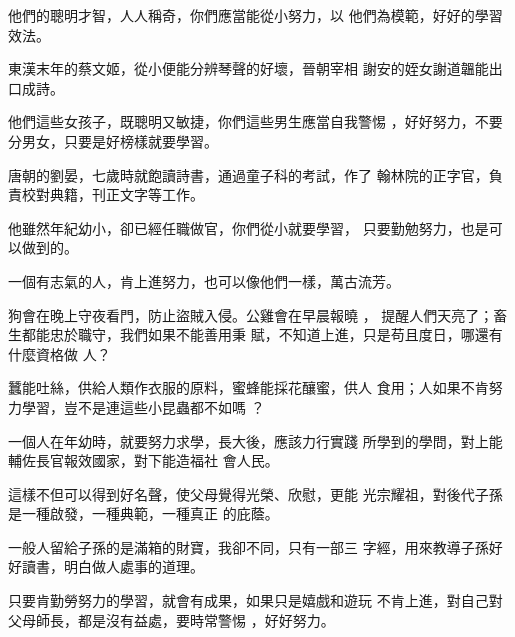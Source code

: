 \documentclass[avery5371,grid]{flashcards}
\begin{document}
{他們的聰明才智，人人稱奇，你們應當能從小努力，以
他們為模範，好好的學習效法。} %
{} %

{東漢末年的蔡文姬，從小便能分辨琴聲的好壞，晉朝宰相
謝安的姪女謝道韞能出口成詩。} %
{} %

{他們這些女孩子，既聰明又敏捷，你們這些男生應當自我警惕
，好好努力，不要分男女，只要是好榜樣就要學習。} %
{} %

{唐朝的劉晏，七歲時就飽讀詩書，通過童子科的考試，作了
翰林院的正字官，負責校對典籍，刊正文字等工作。} %
{} %

{他雖然年紀幼小，卻已經任職做官，你們從小就要學習，
只要勤勉努力，也是可以做到的。} %
{} %

{一個有志氣的人，肯上進努力，也可以像他們一樣，萬古流芳。} %
{} %






{狗會在晚上守夜看門，防止盜賊入侵。公雞會在早晨報曉 ，
提醒人們天亮了；畜生都能忠於職守，我們如果不能善用秉
賦，不知道上進，只是苟且度日，哪還有什麼資格做 人？} %
{} %

{蠶能吐絲，供給人類作衣服的原料，蜜蜂能採花釀蜜，供人
食用；人如果不肯努力學習，豈不是連這些小昆蟲都不如嗎
？} %
{} %

{一個人在年幼時，就要努力求學，長大後，應該力行實踐
所學到的學問，對上能輔佐長官報效國家，對下能造福社
會人民。} %
{} %

{這樣不但可以得到好名聲，使父母覺得光榮、欣慰，更能
光宗耀祖，對後代子孫是一種啟發，一種典範，一種真正
的庇蔭。} %
{} %

{一般人留給子孫的是滿箱的財寶，我卻不同，只有一部三
字經，用來教導子孫好好讀書，明白做人處事的道理。} %
{} %

{只要肯勤勞努力的學習，就會有成果，如果只是嬉戲和遊玩
不肯上進，對自己對父母師長，都是沒有益處，要時常警惕
，好好努力。} %
{} %
\end{document}
